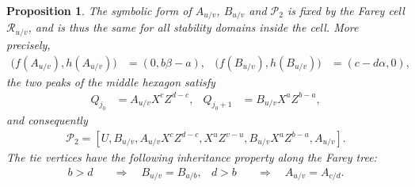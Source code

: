 \documentclass[11pt,reqno,tbtags,a4paper]{amsart}
\numberwithin{equation}{section}
\theoremstyle{plain}%
\newtheorem{proposition}[theorem]{Proposition}
\theoremstyle{definition}
\theoremstyle{remark}
\newcommand\cP{\mathcal P}
\newcommand\cR{{\mathcal R}}
\newcommand\0{{\boldsymbol 0}}
\newcommand\1{{\boldsymbol 1}}
\begin{document}
\begin{proposition}\label{Pm3-cell-data}
The symbolic form of $A_{u/v}$, $B_{u/v}$ and $\cP_2$ is fixed by the Farey
cell $\cR_{u/v}$, and is thus the same for all stability domains inside the
cell.  More precisely,
\begin{align}\label{m3-AB-cell-data}
 \bigl(f(A_{u/v}),h(A_{u/v})\bigr)&=(0,b\beta-a),
 &
 \bigl(f(B_{u/v}),h(B_{u/v})\bigr)&=(c-d\alpha,0),
\end{align}
the two %
peaks of the middle hexagon satisfy
\begin{align}\label{m3-middle-peaks}
 Q_{j_0}&=A_{u/v}X^cZ^{d-c},
 &
 Q_{j_0+1}&=B_{u/v}X^aZ^{b-a},
\end{align}
and consequently
\begin{align}\label{m3-middle-explicit}
 \cP_2=
 [U,B_{u/v},A_{u/v}X^cZ^{d-c},X^uZ^{v-u},
 B_{u/v}X^aZ^{b-a},A_{u/v}].
\end{align}
The tie vertices have the following inheritance property along the Farey tree:
\begin{align}\label{m3-AB-inheritance}
 b>d&\quad\Longrightarrow\quad B_{u/v}=B_{a/b},
 &
 d>b&\quad\Longrightarrow\quad A_{u/v}=A_{c/d}.
\end{align}
%
\end{proposition}
\end{document}
